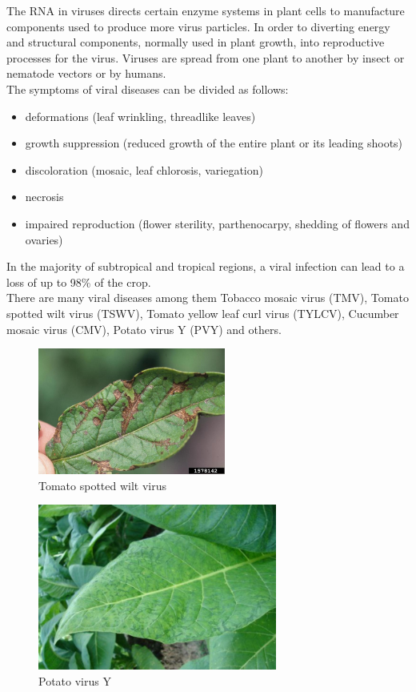 The RNA in viruses directs certain enzyme systems in plant cells to manufacture components used to produce more virus particles.
In order to diverting energy and structural components,
normally used in plant growth, into reproductive processes for the virus. Viruses are
spread from one plant to another by insect or nematode vectors or by humans. \cite{book1} \\

The symptoms of viral diseases can be divided as follows: 
\begin{itemize}
    \item deformations (leaf wrinkling, threadlike leaves)
    \item growth suppression (reduced growth of the entire plant or its leading shoots)
    \item discoloration (mosaic, leaf chlorosis, variegation)
    \item necrosis
    \item impaired reproduction (flower sterility, parthenocarpy, shedding of flowers and ovaries)
\end{itemize}

In the majority of subtropical and tropical regions, a viral infection can lead to a loss of up to 98\% of the crop. \cite{art3} \\

There are many viral diseases among them Tobacco mosaic virus (TMV), Tomato spotted wilt virus (TSWV), Tomato yellow leaf curl virus (TYLCV), Cucumber mosaic virus (CMV), Potato virus Y (PVY) and others.

\begin{figure}[!h]
    \centering
    \includegraphics[width=0.55\textwidth]{chapters/chapter01/fig01/tswv.jpg}
    \caption{Tomato spotted wilt virus}
    \label{fig:my_label}
\end{figure}
\newpage
\begin{figure}[!h]
    \centering
    \includegraphics[width=0.7\textwidth]{chapters/chapter01/fig01/pvy.jpg}
    \caption{Potato virus Y}
    \label{fig:my_label}
\end{figure}

